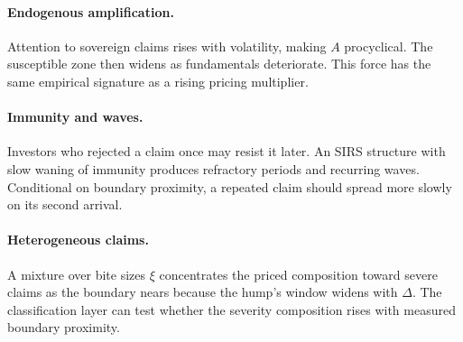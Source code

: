 \documentclass[11pt]{article}
\theoremstyle{definition}
\begin{document}
\paragraph{Endogenous amplification.} Attention to sovereign claims rises with volatility, making $A$ procyclical. The susceptible zone then widens as fundamentals deteriorate. This force has the same empirical signature as a rising pricing multiplier.

\paragraph{Immunity and waves.} Investors who rejected a claim once may resist it later. An SIRS structure with slow waning of immunity produces refractory periods and recurring waves. Conditional on boundary proximity, a repeated claim should spread more slowly on its second arrival.

\paragraph{Heterogeneous claims.} A mixture over bite sizes $\xi$ concentrates the priced composition toward severe claims as the boundary nears because the hump's window widens with $\Delta$. The classification layer can test whether the severity composition rises with measured boundary proximity.

\clearpage
\printbibliography
\end{document}
